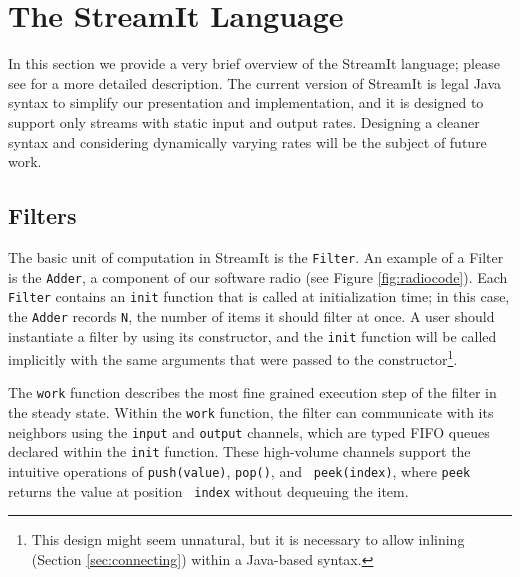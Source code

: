 \section{The StreamIt Language}
\label{sec:language}

In this section we provide a very brief overview of the StreamIt
language; please see \cite{streamittech} for a more detailed
description.  The current version of StreamIt is legal Java syntax to
simplify our presentation and implementation, and it is designed to
support only streams with static input and output rates.  Designing a
cleaner syntax and considering dynamically varying rates will be the
subject of future work.

\subsection{Filters}

The basic unit of computation in StreamIt is the {\tt Filter}.  An
example of a Filter is the {\tt Adder}, a component of our
software radio (see Figure \ref{fig:radiocode}).  Each {\tt Filter}
contains an {\tt init} function that is called at initialization time;
in this case, the {\tt Adder} records {\tt N}, the number of
items it should filter at once.  A user should instantiate a filter by
using its constructor, and the {\tt init} function will be called
implicitly with the same arguments that were passed to the
constructor{\footnote{This design might seem unnatural, but it is
necessary to allow inlining (Section \ref{sec:connecting}) within a
Java-based syntax.}}.

The {\tt work} function describes the most fine grained execution step
of the filter in the steady state.  Within the {\tt work} function,
the filter can communicate with its neighbors using the {\tt input}
and {\tt output} channels, which are typed FIFO queues declared within
the {\tt init} function.  These high-volume channels support the
intuitive operations of {\tt push(value)}, {\tt pop()}, and {\tt
peek(index)}, where {\tt peek} returns the value at position {\tt
index} without dequeuing the item.


